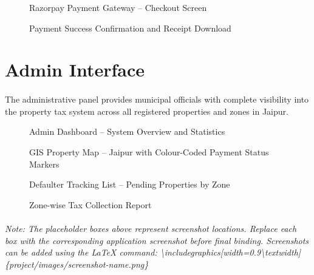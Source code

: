 \begin{figure}[H]
  \centering
  \fbox{\rule{0pt}{8cm}\rule{12cm}{0pt}}
  \caption{Razorpay Payment Gateway -- Checkout Screen}
\end{figure}

\begin{figure}[H]
  \centering
  \fbox{\rule{0pt}{8cm}\rule{12cm}{0pt}}
  \caption{Payment Success Confirmation and Receipt Download}
\end{figure}

\section{Admin Interface}
\paragraph{}The administrative panel provides municipal officials with complete visibility into the property tax system across all registered properties and zones in Jaipur.

\begin{figure}[H]
  \centering
  \fbox{\rule{0pt}{8cm}\rule{12cm}{0pt}}
  \caption{Admin Dashboard -- System Overview and Statistics}
\end{figure}

\begin{figure}[H]
  \centering
  \fbox{\rule{0pt}{8cm}\rule{12cm}{0pt}}
  \caption{GIS Property Map -- Jaipur with Colour-Coded Payment Status Markers}
\end{figure}

\begin{figure}[H]
  \centering
  \fbox{\rule{0pt}{8cm}\rule{12cm}{0pt}}
  \caption{Defaulter Tracking List -- Pending Properties by Zone}
\end{figure}

\begin{figure}[H]
  \centering
  \fbox{\rule{0pt}{8cm}\rule{12cm}{0pt}}
  \caption{Zone-wise Tax Collection Report}
\end{figure}

\paragraph{}\textit{Note: The placeholder boxes above represent screenshot locations. Replace each box with the corresponding application screenshot before final binding. Screenshots can be added using the LaTeX command: \textbackslash includegraphics[width=0.9\textbackslash textwidth]\{project/images/screenshot-name.png\}}
